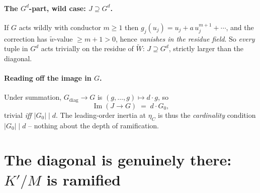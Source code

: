 \documentclass[11pt]{article}
\begin{document}
\paragraph{The $G^d$-part, wild case: $J\supseteq G^d$.}
If $G$ acts wildly with conductor $m\ge1$ then $g_j(u_j)=u_j+a\,u_j^{m+1}+\cdots$,
and the correction has $\widetilde w$-value $\ge m+1>0$, hence \emph{vanishes in
the residue field}. So \emph{every} tuple in $G^d$ acts trivially on the residue
of $\widetilde W$: $J\supseteq G^d$, strictly larger than the diagonal.

\paragraph{Reading off the image in $G$.}
Under summation, $G_{\mathrm{diag}}\to G$ is $(g,\dots,g)\mapsto d\cdot g$, so
\begin{equation}\label{eq:image}
\operatorname{Im}(J\to G)\;=\;d\cdot G_0 ,
\end{equation}
trivial \emph{iff $|G_0|\mid d$}. The leading-order inertia at $\eta_C$ is thus
the \emph{cardinality} condition $|G_0|\mid d$ -- nothing about the depth of
ramification.

\section{The diagonal is genuinely there: \texorpdfstring{$K'/M$}{K'/M} is ramified}\label{sec:Kprime}
\end{document}
